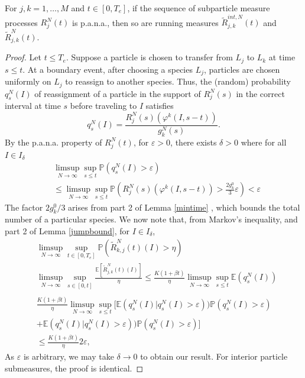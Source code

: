 \begin{theorem}\label{pacthm}  For $j,k = 1, \dots, M$ and  $t\in [0,T_e]$,  if the sequence of subparticle measure processes $R_j^N(t)$ is p.a.n.a., then so are running measures $\tilde R_{j,k}^{int,N}(t)$ and $\tilde R_{j,k}^{N}(t)$.
\end{theorem}

\begin{proof} 
Let $t \le T_e$.  
 Suppose a particle is chosen to transfer from $L_j$ to $L_k$ at time $s\le t$.  At a boundary event, after choosing a species $L_j$, particles are chosen uniformly on $L_j$ to reassign to another species. Thus, the (random) probability $q^N_s(I)$ of reassignment of a particle in the support of $R_j^N(s)$ in the correct interval at time $s$ before traveling to $I$ satisfies
\begin{equation}
q_s^N(I) = \frac{R_j^N(s)( \varphi^k(I, s-t))}{g_k^N(s)}.
\end{equation}
By the p.a.n.a. property of $R_j^N(t)$, for $\varepsilon>0$, there exists $\delta>0$ where for all $I \in I_\delta$
\begin{align}\label{probrightspec}
&\limsup_{N\rightarrow \infty} \sup_{s\le t} \mathbb P(q^N_s(I)>\varepsilon)\\
&\le \limsup_{N\rightarrow \infty} \sup_{s\le t}\mathbb P(R_j^N(s)( \varphi^k(I, s-t))> \frac{2g^0_k}{3}\varepsilon)<\varepsilon\nonumber
\end{align}
  The factor $2g_k^0/3$ arises from part 2 of Lemma \ref{mintime} , which bounds the total number of a particular species.
We now note that, from Markov's inequality, and part  2 of Lemma \ref{jumpbound}, for $I \in I_\delta$, 
 \begin{align}
 &\limsup_{N\rightarrow \infty} \sup_{t \in [0,T_e]}\mathbb P(\tilde R_{k,j}^{N}(t)(I) >\eta)\\
 &\limsup_{N\rightarrow \infty} \sup_{s \in [0,t]} \frac{\mathbb E\left[\tilde R_{j,k}^{N}(t)(I)\right]}{\eta}\le  \frac{K(1+\beta t)}{\eta}\limsup_{N \rightarrow \infty} \sup_{s\le t}\mathbb{E}(q_s^N(I)) \nonumber\\
 \nonumber \\  &\frac{K(1+\beta t)}{\eta}\limsup_{N \rightarrow \infty} \sup_{s\le t} \Big[\mathbb{E}(q_s^N(I)|q_s^N(I)>\varepsilon))\mathbb P(q_s^N(I)>\varepsilon)\nonumber\\&+\mathbb{E}(q_s^N(I)|q_s^N(I)>\varepsilon))\mathbb P(q_s^N(I)>\varepsilon)\Big]\nonumber\\&\le  \frac{K(1+\beta t)}{\eta} 2\varepsilon  \nonumber, 
\end{align}
As $\varepsilon$ is arbitrary, we may take $\delta\rightarrow 0$ to obtain our result. For interior particle submeasures, the proof is identical.   
\end{proof}

